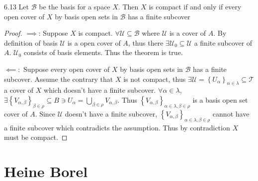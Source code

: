 \documentclass{article}
\newcommand*{\T}{\mathcal{T}}
\newcommand*{\B}{\mathcal{B}}
\newcommand*{\subeq}{\subseteq}
\begin{document}
\bigskip

\begin{claim}{6.13}\label{Claim 6.13.}
    Let $\B$ be the basis for a space $X$. Then $X$ is compact if and only if every open cover of $X$ by basis open sets in $\B$ has a finite subcover      
\end{claim}
\begin{proof}
    $\implies$: Suppose $X$ is compact. $\forall \mathcal{U} \subseteq \B$ where $\mathcal{U}$ is a cover of $A$. By definition of basis $\mathcal{U}$ is a open cover of $A$, thus there $\exists \mathcal{U}_0 \subeq \mathcal{U}$ a finite subcover of $A$. $\mathcal{U}_0$ consists of basis elements. Thus the theorem is true. 
    
    $\impliedby:$ Suppose every open cover of $X$ by basis open sets in $\B$ has a finite subcover. Assume the contrary that $X$ is not compact, thus $\exists \mathcal{U} = \left\{ U_\alpha \right\}_{\alpha \in \lambda} \subseteq \T$ a cover of $X$ which doesn't have a finite subcover. $\forall \alpha \in \lambda$, $\exists \left\{ V_{\alpha, \beta} \right\}_{\beta \in \rho} \subseteq B \ni U_\alpha = \bigcup_{\beta \in \rho} V_{\alpha, \beta}$. Thus $\left\{ V_{\alpha, \beta} \right\}_{\alpha \in \lambda, \beta \in \rho}$ is a basis open set cover of $A$. Since $\mathcal{U}$ doesn't have a finite subcover, $\left\{ V_{\alpha, \beta} \right\}_{\alpha \in \lambda, \beta \in \rho}$ cannot have a finite subcover which contradicts the assumption. Thus by contradiction $X$ must be compact.    
\end{proof}

\pagebreak

\section{Heine Borel}
\end{document}
